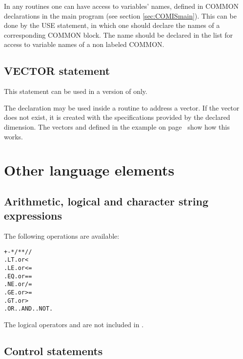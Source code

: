 In any \COMIS{} routines one can have access to variables'
names,  defined in COMMON declarations in
the main \COMIS{} program (see section \ref{sec:COMISmain}). 
This can be done by
the USE statement, in which one should declare the names of
a corresponding COMMON block.
The name  should be declared in the list for access
to variable names of a non labeled COMMON.
 
\subsection*{VECTOR statement}
 
This statement can be used in a \PAW{} version of \COMIS{} only.
 
The declaration  may be used inside a \COMIS{}
routine to address a \KUIP{} vector. 
If the vector does not exist,
it is created with the specifications provided by the declared
dimension.
The vectors  and  defined in the example on 
page~\pageref{sec:comis-with-paw} show how this works.

\section{Other language elements}

\subsection{Arithmetic, logical and character string expressions}

The following operations are available:

\begin{alltt}
    +  -  *  /  **  //
   .LT.   or   <
   .LE.   or   <=
   .EQ.   or   ==
   .NE.   or   /=
   .GE.   or   >=
   .GT.   or   >
   .OR.  .AND.  .NOT.
\end{alltt}

The logical operators  and  are not included
in \COMIS{}.
 
\subsection{Control statements}
 
